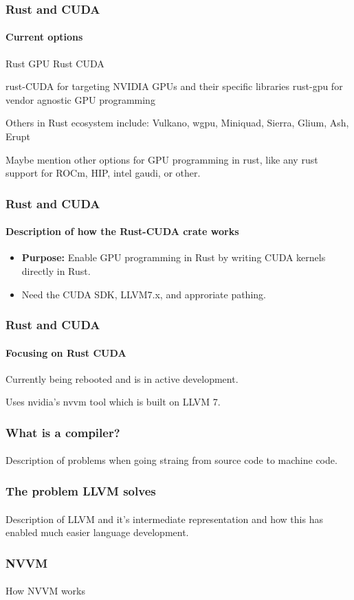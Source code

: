 \documentclass[aspectratio=169]{beamer}
\begin{document}
\begin{frame}
	\frametitle{Rust and CUDA}
	\framesubtitle{Current options}

	\begin{outline}[itemize]
		\1 Rust GPU
		\1 Rust CUDA
	\end{outline}

	rust-CUDA for targeting NVIDIA GPUs and their specific libraries
	rust-gpu for vendor agnostic GPU programming

 	Others in Rust ecosystem include: Vulkano, wgpu, Miniquad, Sierra, Glium, Ash, Erupt

	Maybe mention other options for GPU programming in rust, like any rust support for ROCm, HIP, intel gaudi, or other.
\end{frame}

\begin{frame}
	\frametitle{Rust and CUDA}
	\framesubtitle{Description of how the Rust-CUDA crate works}

 	\begin{itemize}
  		\item \textbf{Purpose:} Enable GPU programming in Rust by writing CUDA kernels directly in Rust.
      		\item Need the CUDA SDK, LLVM7.x, and approriate pathing.
  	\end{itemize}
\end{frame}

\begin{frame}
	\frametitle{Rust and CUDA}
	\framesubtitle{Focusing on Rust CUDA}

	Currently being rebooted and is in active development.

	Uses nvidia's nvvm tool which is built on LLVM 7.
\end{frame}

\begin{frame}
	\frametitle{What is a compiler?}
	\framesubtitle{}

	Description of problems when going straing from source code to machine code.
\end{frame}

\begin{frame}
	\frametitle{The problem LLVM solves}
	\framesubtitle{}

	Description of LLVM and it's intermediate representation and how this has enabled much easier language development.
\end{frame}

\begin{frame}
	\frametitle{NVVM}
	\framesubtitle{}

	How NVVM works
\end{frame}
\end{document}
